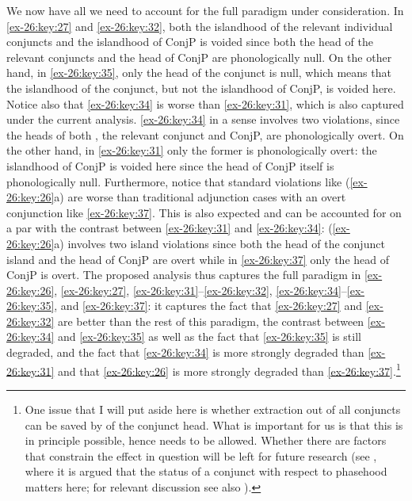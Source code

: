 \documentclass[output=paper]{langsci/langscibook}
\begin{document}
We now have all we need to account for the full paradigm under consideration.
In \eqref{ex-26:key:27} and \eqref{ex-26:key:32}, both the islandhood of the relevant individual conjuncts and
the islandhood of ConjP is voided since both the head of the relevant conjuncts
and the head of ConjP are phonologically null. On the other hand, in \eqref{ex-26:key:35}, only
the head of the conjunct is null, which means that the islandhood of the
conjunct, but not the islandhood of ConjP, is voided here. Notice also that
\eqref{ex-26:key:34} is worse than \eqref{ex-26:key:31}, which is also captured under the current analysis.
\eqref{ex-26:key:34} in a sense involves two violations, since the heads of both , the
relevant conjunct and ConjP, are phonologically overt. On the other hand, in
\eqref{ex-26:key:31} only the former is phonologically overt: the islandhood of ConjP is voided
here since the head of ConjP itself is phonologically null. Furthermore, notice
that standard  violations like (\ref{ex-26:key:26}a) are worse than traditional
adjunction cases with an overt conjunction like \eqref{ex-26:key:37}. This is also expected and
can be accounted for on a par with the contrast between \eqref{ex-26:key:31} and \eqref{ex-26:key:34}: (\ref{ex-26:key:26}a)
involves two island violations since both the head of the conjunct island and
the head of ConjP are overt while in \eqref{ex-26:key:37} only the head of ConjP is overt. The
proposed analysis thus captures the full paradigm in \eqref{ex-26:key:26}, \eqref{ex-26:key:27}, \eqref{ex-26:key:31}--\eqref{ex-26:key:32},
\eqref{ex-26:key:34}--\eqref{ex-26:key:35}, and \eqref{ex-26:key:37}: it captures the fact that \eqref{ex-26:key:27} and \eqref{ex-26:key:32} are better than
the rest of this paradigm, the contrast between \eqref{ex-26:key:34} and \eqref{ex-26:key:35} as well as the
fact that \eqref{ex-26:key:35} is still degraded, and the fact that \eqref{ex-26:key:34} is more strongly
degraded than \eqref{ex-26:key:31} and that \eqref{ex-26:key:26} is more strongly degraded than
\eqref{ex-26:key:37}.\footnote{One issue that I will put aside here is whether extraction out
    of all conjuncts can be saved by  of the conjunct head. What is
    important for us is that this is in principle possible, hence needs to be
    allowed. Whether there are factors that constrain the effect in question
will be left for future research (see \citealt{Boskovic2017}, where it is
argued that the status of a conjunct with respect to phasehood matters here;
for relevant discussion see also \citealt{Boskovicinprep}).}
\end{document}
